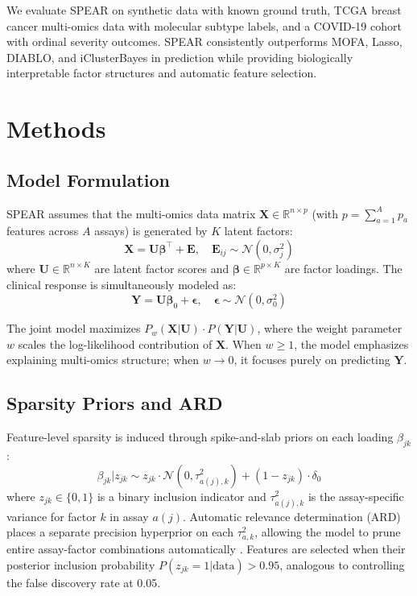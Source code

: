 \documentclass[11pt]{article}
\begin{document}
We evaluate SPEAR on synthetic data with known ground truth, TCGA breast cancer multi-omics data with molecular subtype labels, and a COVID-19 cohort with ordinal severity outcomes. SPEAR consistently outperforms MOFA, Lasso, DIABLO, and iClusterBayes in prediction while providing biologically interpretable factor structures and automatic feature selection.

\section{Methods}

\subsection{Model Formulation}

SPEAR assumes that the multi-omics data matrix $\mathbf{X} \in \mathbb{R}^{n \times p}$ (with $p = \sum_{a=1}^{A} p_a$ features across $A$ assays) is generated by $K$ latent factors:
\begin{equation}
\mathbf{X} = \mathbf{U} \boldsymbol{\beta}^\top + \mathbf{E}, \quad \mathbf{E}_{ij} \sim \mathcal{N}(0, \sigma^2_j)
\end{equation}
where $\mathbf{U} \in \mathbb{R}^{n \times K}$ are latent factor scores and $\boldsymbol{\beta} \in \mathbb{R}^{p \times K}$ are factor loadings. The clinical response is simultaneously modeled as:
\begin{equation}
\mathbf{Y} = \mathbf{U} \boldsymbol{\beta}_0 + \boldsymbol{\epsilon}, \quad \boldsymbol{\epsilon} \sim \mathcal{N}(0, \sigma^2_0)
\end{equation}

The joint model maximizes $P_w(\mathbf{X}|\mathbf{U}) \cdot P(\mathbf{Y}|\mathbf{U})$, where the weight parameter $w$ scales the log-likelihood contribution of $\mathbf{X}$. When $w \geq 1$, the model emphasizes explaining multi-omics structure; when $w \to 0$, it focuses purely on predicting $\mathbf{Y}$.

\subsection{Sparsity Priors and ARD}

Feature-level sparsity is induced through spike-and-slab priors on each loading $\beta_{jk}$:
\begin{equation}
\beta_{jk} | z_{jk} \sim z_{jk} \cdot \mathcal{N}(0, \tau^2_{a(j),k}) + (1 - z_{jk}) \cdot \delta_0
\end{equation}
where $z_{jk} \in \{0, 1\}$ is a binary inclusion indicator and $\tau^2_{a(j),k}$ is the assay-specific variance for factor $k$ in assay $a(j)$. Automatic relevance determination (ARD) places a separate precision hyperprior on each $\tau^2_{a,k}$, allowing the model to prune entire assay-factor combinations automatically \citep{tipping2001sparse}. Features are selected when their posterior inclusion probability $P(z_{jk} = 1 | \text{data}) > 0.95$, analogous to controlling the false discovery rate at 0.05.
\end{document}
